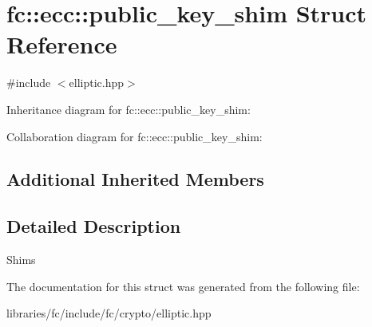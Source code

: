\hypertarget{structfc_1_1ecc_1_1public__key__shim}{}\section{fc\+:\+:ecc\+:\+:public\+\_\+key\+\_\+shim Struct Reference}
\label{structfc_1_1ecc_1_1public__key__shim}


{\ttfamily \#include $<$elliptic.\+hpp$>$}



Inheritance diagram for fc\+:\+:ecc\+:\+:public\+\_\+key\+\_\+shim\+:


Collaboration diagram for fc\+:\+:ecc\+:\+:public\+\_\+key\+\_\+shim\+:
\subsection*{Additional Inherited Members}


\subsection{Detailed Description}
Shims 

The documentation for this struct was generated from the following file\+:\begin{DoxyCompactItemize}
\item 
libraries/fc/include/fc/crypto/elliptic.\+hpp\end{DoxyCompactItemize}
